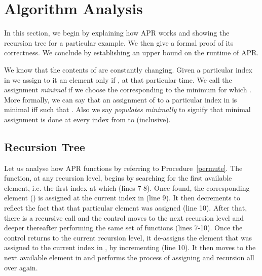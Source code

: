 \documentclass{article}
\begin{document}
\section{Algorithm Analysis}
\label{sec:anal}

In this section, we begin by explaining how APR works and showing the recursion tree for a particular example. We then give a formal proof of its correctness. We conclude by establishing an upper bound on the runtime of APR.

We know that the contents of  are constantly changing. Given a particular index in  we assign to it an element  only if , at that particular time. We call the assignment \emph{minimal} if we choose the  corresponding to the minimum  for which . More formally, we can say that an assignment of  to a particular index in  is minimal iff  such that . Also we say \emph{populates  minimally} to signify that minimal assignment is done at every index from  to  (inclusive).

\subsection{Recursion Tree}
\label{subsec:rectree}

Let us analyse how APR functions by referring to Procedure~\ref{permute}. The function, at any recursion level, begins by searching for the first available element, i.e. the first index  at which  (lines 7-8). Once found, the corresponding element () is assigned at the current index in  (line 9). It then decrements  to reflect the fact that that particular element was assigned (line 10). After that, there is a recursive call and the control moves to the next recursion level and deeper thereafter performing the same set of functions (lines 7-10). Once the control returns to the current recursion level, it de-assigns the element that was assigned to the current index in , by incrementing  (line 10). It then moves to the next available element in  and performs the process of assigning and recursion all over again.
\end{document}
